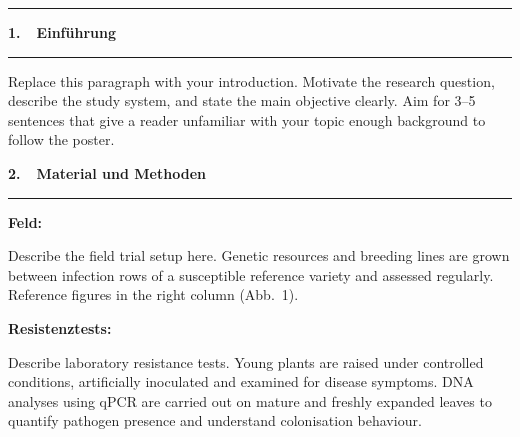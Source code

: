 \documentclass[final]{beamer}
\newcommand{\postersection}[1]{%
  \vspace{4mm}%
  {\color{HohenheimGreen}\bfseries\large #1}\\[-1mm]%
  {\color{HohenheimGreen}\rule{\linewidth}{1.5pt}}%
  \vspace{2mm}%
}
\newcommand{\postersubsec}[1]{%
  \smallskip%
  {\bfseries #1}%
  \smallskip%
}
\newlength{\outermargin}  \setlength{\outermargin}{18mm}
\newlength{\leftcolwidth}
\begin{document}
\begin{frame}[t]{}

{\color{HohenheimGreen}\rule{\paperwidth}{7pt}}

\vspace{12mm}

\noindent\hspace{\outermargin}%
%
\begin{minipage}[t]{\leftcolwidth}
\color{HohenheimDark}

  \postersection{1.~~Einführung}

  Replace this paragraph with your introduction. Motivate the research
  question, describe the study system, and state the main objective clearly.
  Aim for 3–5 sentences that give a reader unfamiliar with your topic enough
  background to follow the poster.

  \vspace{8mm}

  \postersection{2.~~Material und Methoden}

  \postersubsec{Feld:}

  Describe the field trial setup here. Genetic resources and breeding lines
  are grown between infection rows of a susceptible reference variety and
  assessed regularly. Reference figures in the right column (Abb.~1).

  \vspace{4mm}
  \postersubsec{Resistenztests:}

  Describe laboratory resistance tests. Young plants are raised under
  controlled conditions, artificially inoculated and examined for disease
  symptoms. DNA analyses using qPCR are carried out on mature and freshly
  expanded leaves to quantify pathogen presence and understand colonisation
  behaviour.


\end{minipage}
\end{frame}
\end{document}
